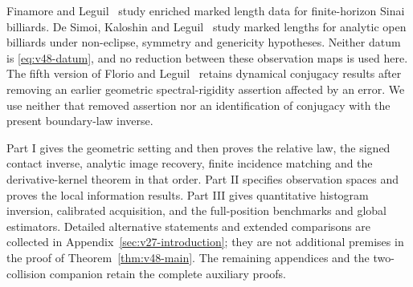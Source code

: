 Finamore and Leguil~\cite{FinamoreLeguil} study enriched marked length
data for finite-horizon Sinai billiards.  De Simoi, Kaloshin and
Leguil~\cite{DSKL} study marked lengths for analytic open billiards
under non-eclipse, symmetry and genericity hypotheses.  Neither datum
is \eqref{eq:v48-datum}, and no reduction between these observation
maps is used here.  The fifth version of Florio and
Leguil~\cite{FlorioLeguil} retains dynamical conjugacy results after
removing an earlier geometric spectral-rigidity assertion affected by
an error.  We use neither that removed assertion nor an identification
of conjugacy with the present boundary-law inverse.

Part I gives the geometric setting and then proves the relative law,
the signed contact inverse, analytic image recovery, finite incidence
matching and the derivative-kernel theorem in that order.  Part II
specifies observation spaces and proves the local information results.
Part III gives quantitative histogram inversion, calibrated acquisition,
and the full-position benchmarks and global estimators.  Detailed
alternative statements and extended comparisons are collected in
Appendix~\ref{sec:v27-introduction}; they are not additional premises
in the proof of Theorem~\ref{thm:v48-main}.  The remaining appendices
and the two-collision companion retain the complete auxiliary proofs.
